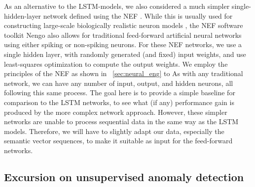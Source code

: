 As an alternative to the \ac{LSTM}-models, we also considered a much simpler single-hidden-layer network defined using the \acf{NEF} \parencite{Eliasmith2003}.
While this is usually used for constructing large-scale biologically realistic neuron models \parencite{Eliasmith2012}, the \ac{NEF} software toolkit \acs{Nengo} \parencite{Bekolay2014} also allows for traditional feed-forward artificial neural networks using either spiking or non-spiking neurons.
For these \ac{NEF} networks, we use a single hidden layer, with randomly generated (and fixed) input weights, and use least-squares optimization to compute the output weights.
We employ the principles of the \ac{NEF} as shown in ~\ref{sec:neural_eng} to 
As with any traditional network, we can have any number of input, output, and hidden neurons, all following this same process.
The goal here is to provide a simple baseline for comparison to the \ac{LSTM} networks, to see what (if any) performance gain is produced by the more complex network approach.
However, these simpler networks are unable to process sequential data in the same way as the \ac{LSTM} models.
Therefore, we will have to slightly adapt our data, especially the semantic vector sequences, to make it suitable as input for the feed-forward networks.

\subsection{Excursion on unsupervised anomaly detection}%
\label{subsec:excursion_on_unsupervised_anomaly_detection}


